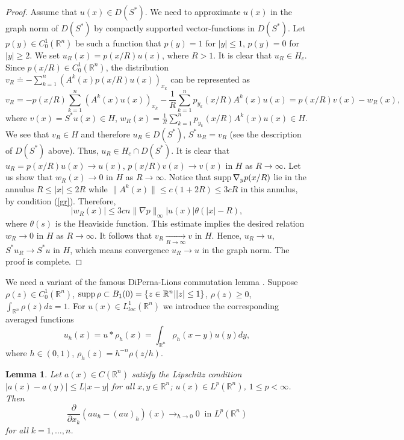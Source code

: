 \documentclass[12pt]{article}
\theoremstyle{plain}
\newtheorem{lemma}{Lemma}[section]
\theoremstyle{definition}
\numberwithin{equation}{section}
\newcommand{\R}{{\mathbb R}}
\newcommand{\supp}{\mathop{\rm supp}}
\begin{document}
\begin{proof}
Assume that $u(x)\in D(S^*)$. We need to approximate $u(x)$ in the graph norm of $D(S^*)$ by compactly supported vector-functions in $D(S^*)$. Let $p(y)\in C_0^1(\R^n)$ be such a function that $p(y)=1$ for $|y|\le 1$, $p(y)=0$ for $|y|\ge 2$. We set $u_R(x)=p(x/R)u(x)$, where $R>1$. It is clear that $u_R\in H_c$.
Since $p(x/R)\in C_0^1(\R^n)$, the distribution $\displaystyle v_R\doteq -\sum_{k=1}^n (A^k(x)p(x/R)u(x))_{x_k}$ can be represented as
\begin{equation}\label{4}
v_R=-p(x/R)\sum_{k=1}^n (A^k(x)u(x))_{x_k}-\frac{1}{R}\sum_{k=1}^n p_{y_k}(x/R)A^k(x)u(x)=p(x/R)v(x)-w_R(x),
\end{equation}
where $v(x)=S^*u(x)\in H$, $\displaystyle w_R(x)=\frac{1}{R}\sum_{k=1}^n p_{y_k}(x/R)A^k(x)u(x)\in H$. We see that $v_R\in H$ and therefore $u_R\in D(S^*)$, $S^*u_R=v_R$ (see the description of $D(S^*)$ above). Thus, $u_R\in H_c\cap D(S^*)$. It is clear that $u_R=p(x/R)u(x)\to u(x)$, $p(x/R)v(x)\to v(x)$ in $H$ as $R\to\infty$. Let us show that $w_R(x)\to 0$ in $H$
as $R\to\infty$. Notice that $\supp \nabla_y p(x/R)$ lie in the annulus $R\le |x|\le 2R$ while $\|A^k(x)\|\le c(1+2R)\le 3cR$ in this annulus, by condition (\ref{gr}). Therefore,
\[
|w_R(x)|\le 3cn\|\nabla p\|_\infty |u(x)|\theta(|x|-R),
\]
where $\theta(s)$ is the Heaviside function. This estimate implies the desired relation $w_R\to 0$ in $H$ as $R\to\infty$.
It follows that $v_R\mathop{\to}\limits_{R\to\infty} v$ in $H$. Hence, $u_R\to u$, $S^*u_R\to S^*u$ in $H$, which means
convergence $u_R\to u$ in the graph norm. The proof is complete.
\end{proof}

We need a variant of the famous DiPerna-Lions commutation lemma
\cite[Lemma~II.1]{DiL}. Suppose $\rho(z)\in C_0^1(\R^n)$, $\supp\rho\subset B_1(0)=\{z\in\R^n | |z|\le 1\}$, $\rho(z)\ge 0$, $\int_{\R^n}\rho(z)dz=1$. For $u(x)\in L^1_{loc}(\R^n)$ we introduce the corresponding averaged functions
\[u_h(x)=u*\rho_h(x)=\int_{\R^n}\rho_h(x-y)u(y)dy,\]
where $h\in (0,1)$, $\rho_h(z)=h^{-n}\rho(z/h)$.

\begin{lemma}\label{lmDL}
Let $a(x)\in C(\R^n)$ satisfy the Lipschitz condition
${|a(x)-a(y)|\le L|x-y|}$ for all $x,y\in\R^n$; $u(x)\in L^p(\R^n)$, $1\le p<\infty$. Then
\begin{equation}\label{DL}
\frac{\partial}{\partial x_k}(au_h-(au)_h)(x)\mathop{\to}_{h\to 0} 0 \ \mbox{ in } L^p(\R^n)
\end{equation}
for all $k=1,\ldots,n$.
\end{lemma}
\end{document}
